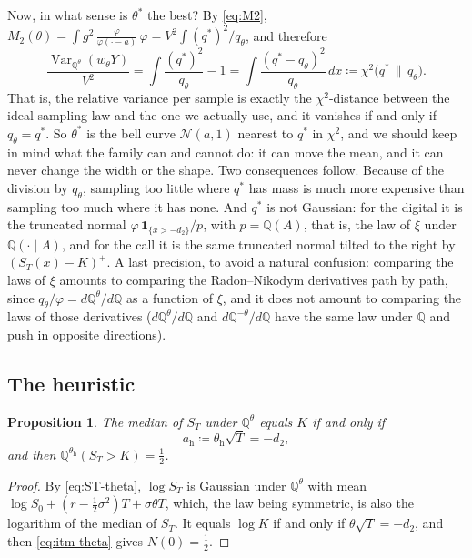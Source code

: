 \documentclass[11pt,a4paper]{article}
\theoremstyle{plain}
\newtheorem{proposition}[theorem]{Proposition}
\theoremstyle{definition}
\theoremstyle{remark}
\newcommand{\Q}{\mathbb{Q}}
\newcommand{\1}{\mathbf{1}}
\newcommand{\eqdef}{\coloneqq}
\newcommand{\Var}{\operatorname{Var}}
\newcommand{\Qt}{\Q^{\theta}}
\begin{document}
Now, in what sense is $\theta^*$ the best? By \eqref{eq:M2}, $M_2(\theta) = \int g^2\, \frac{\varphi}{\varphi(\cdot - a)}\, \varphi = V^2 \int (q^*)^2/q_\theta$, and therefore
\begin{equation}\label{eq:chi2}
  \frac{\Var_{\Qt}(w_\theta Y)}{V^2} = \int \frac{(q^*)^2}{q_\theta} - 1 = \int \frac{(q^* - q_\theta)^2}{q_\theta}\,dx \eqdef \chi^2\bigl(q^* \,\|\, q_\theta\bigr).
\end{equation}
That is, the relative variance per sample is exactly the $\chi^2$-distance between the ideal sampling law and the one we actually use, and it vanishes if and only if $q_\theta = q^*$. So $\theta^*$ is the bell curve $\mathcal N(a, 1)$ nearest to $q^*$ in $\chi^2$, and we should keep in mind what the family can and cannot do: it can move the mean, and it can never change the width or the shape. Two consequences follow. Because of the division by $q_\theta$, sampling too little where $q^*$ has mass is much more expensive than sampling too much where it has none. And $q^*$ is not Gaussian: for the digital it is the truncated normal $\varphi\, \1_{\{x > -d_2\}}/p$, with $p = \Q(A)$, that is, the law of $\xi$ under $\Q(\cdot \mid A)$, and for the call it is the same truncated normal tilted to the right by $(S_T(x) - K)^+$. A last precision, to avoid a natural confusion: comparing the laws of $\xi$ amounts to comparing the Radon--Nikodym derivatives path by path, since $q_\theta/\varphi = d\Qt/d\Q$ as a function of $\xi$, and it does not amount to comparing the laws of those derivatives ($d\Qt/d\Q$ and $d\Q^{-\theta}/d\Q$ have the same law under $\Q$ and push in opposite directions).

\subsection{The heuristic}
\label{subsec:heur}

\begin{proposition}\label{prop:heur}
The median of $S_T$ under $\Qt$ equals $K$ if and only if
\begin{equation}\label{eq:heur}
  a_{\mathrm h} \eqdef \theta_{\mathrm h}\sqrt T = -d_2 ,
\end{equation}
and then $\Q^{\theta_{\mathrm h}}(S_T > K) = \tfrac12$.
\end{proposition}

\begin{proof}
By \eqref{eq:ST-theta}, $\log S_T$ is Gaussian under $\Qt$ with mean $\log S_0 + (r - \tfrac12\sigma^2)T + \sigma\theta T$, which, the law being symmetric, is also the logarithm of the median of $S_T$. It equals $\log K$ if and only if $\theta\sqrt T = -d_2$, and then \eqref{eq:itm-theta} gives $N(0) = \tfrac12$.
\end{proof}
\end{document}
